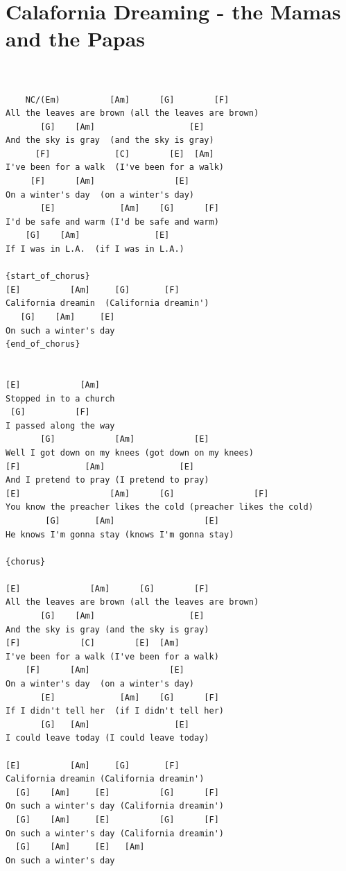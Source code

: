 \documentclass[
]{book}
\let\stdsection\section
\renewcommand\section{\clearpage\stdsection}
\begin{document}
\hypertarget{calafornia-dreaming---the-mamas-and-the-papas}{%
\section{Calafornia Dreaming - the Mamas and the Papas}\label{calafornia-dreaming---the-mamas-and-the-papas}}

\begin{verbatim}


    NC/(Em)          [Am]      [G]        [F]
All the leaves are brown (all the leaves are brown)
       [G]    [Am]                   [E]
And the sky is gray  (and the sky is gray)
      [F]             [C]        [E]  [Am]
I've been for a walk  (I've been for a walk)
     [F]      [Am]                [E]
On a winter's day  (on a winter's day)
       [E]             [Am]    [G]      [F]
I'd be safe and warm (I'd be safe and warm)
    [G]    [Am]               [E]
If I was in L.A.  (if I was in L.A.)

{start_of_chorus}
[E]          [Am]     [G]       [F]
California dreamin  (California dreamin')
   [G]    [Am]     [E]
On such a winter's day
{end_of_chorus}


[E]            [Am]
Stopped in to a church
 [G]          [F]
I passed along the way
       [G]            [Am]            [E]
Well I got down on my knees (got down on my knees)
[F]             [Am]               [E]
And I pretend to pray (I pretend to pray)
[E]                  [Am]      [G]                [F]
You know the preacher likes the cold (preacher likes the cold)
        [G]       [Am]                  [E]
He knows I'm gonna stay (knows I'm gonna stay)

{chorus}

[E]              [Am]      [G]        [F]
All the leaves are brown (all the leaves are brown)
       [G]    [Am]                   [E]
And the sky is gray (and the sky is gray)
[F]            [C]        [E]  [Am]
I've been for a walk (I've been for a walk)
    [F]      [Am]                [E]
On a winter's day  (on a winter's day)
       [E]             [Am]    [G]      [F]
If I didn't tell her  (if I didn't tell her)
       [G]   [Am]                 [E]
I could leave today (I could leave today)

[E]          [Am]     [G]       [F]
California dreamin (California dreamin')
  [G]    [Am]     [E]          [G]      [F]
On such a winter's day (California dreamin')
  [G]    [Am]     [E]          [G]      [F]
On such a winter's day (California dreamin')
  [G]    [Am]     [E]   [Am]
On such a winter's day
\end{verbatim}
\end{document}
